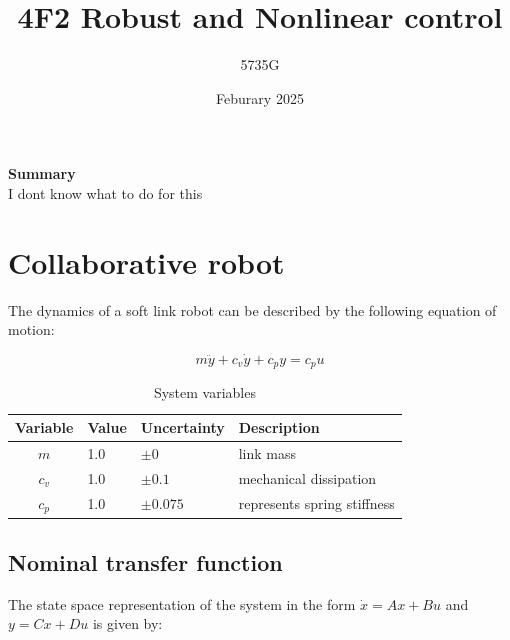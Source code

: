 \documentclass{article}
\begin{document}
\title{4F2 Robust and Nonlinear control}
\author{5735G}
\date{Feburary 2025}
\maketitle 

\begin{center}
    \textbf{Summary} \\
    I dont know what to do for this
\end{center}

\section{Collaborative robot}

The dynamics of a soft link robot can be described by the following equation of motion:

\begin{equation}
    m\ddot{y} + c_v \dot{y} + c_p y = c_p u
\end{equation}

\begin{table}[h]
    \centering
    \begin{tabular}{c|ll|l}
        Variable & Value & Uncertainty & Description \\
        \hline
        $m$ & 1.0 & $\pm0$ & link mass \\
        $c_v$ & 1.0 & $\pm 0.1$ & mechanical dissipation \\
        $c_p$ & 1.0 & $\pm 0.075$ & represents spring stiffness \\
    \end{tabular}
    \caption{System variables}
    \label{tab:parameters}
\end{table}

\subsection{Nominal transfer function}

The state space representation of the system in the form $\dot{x} = Ax + Bu$ and $y = Cx + Du$ is given by:
\end{document}
